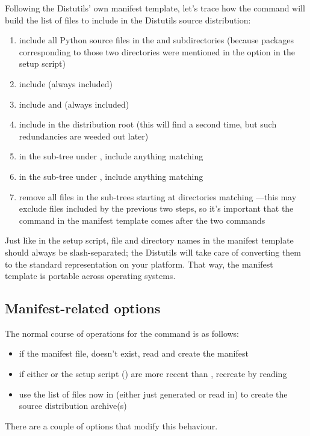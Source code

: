 \documentclass{howto}
\begin{document}
Following the Distutils' own manifest template, let's trace how the
 command will build the list of files to include in the
Distutils source distribution:
\begin{enumerate}
\item include all Python source files in the  and
   subdirectories (because packages
  corresponding to those two directories were mentioned in the
   option in the setup script)
\item include  (always included)
\item include  and  (always included)
\item include  in the distribution root (this will find
   a second time, but such redundancies are weeded out
  later)
\item in the sub-tree under , include anything matching
\item in the sub-tree under , include anything matching
\item remove all files in the sub-trees starting at directories matching
  ---this may exclude files included by the
  previous two steps, so it's important that the  command in
  the manifest template comes after the two 
  commands
\end{enumerate}

Just like in the setup script, file and directory names in the manifest
template should always be slash-separated; the Distutils will take care
of converting them to the standard representation on your platform.
That way, the manifest template is portable across operating systems.


\subsection{Manifest-related options}
\label{manifest-options}

The normal course of operations for the  command is as
follows:
\begin{itemize}
\item if the manifest file,  doesn't exist, read
   and create the manifest
\item if either  or the setup script ()
  are more recent than , recreate  by
  reading 
\item use the list of files now in  (either just
  generated or read in) to create the source distribution archive(s)
\end{itemize}
There are a couple of options that modify this behaviour.
\end{document}
